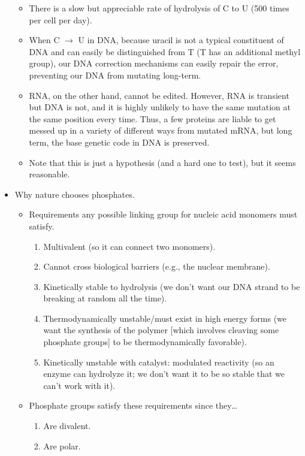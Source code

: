 \documentclass[../notes.tex]{subfiles}
\begin{document}
\begin{itemize}
    \begin{itemize}
        \item There is a slow but appreciable rate of hydrolysis of C to U (500 times per cell per day).
        \item When C $\to$ U in DNA, because uracil is not a typical constituent of DNA and can easily be distinguished from T (T has an additional methyl group), our DNA correction mechanisms can easily repair the error, preventing our DNA from mutating long-term.
        \item RNA, on the other hand, cannot be edited. However, RNA is transient but DNA is not, and it is highly unlikely to have the same mutation at the same position every time. Thus, a few proteins are liable to get messed up in a variety of different ways from mutated mRNA, but long term, the base genetic code in DNA is preserved.
        \item Note that this is just a hypothesis (and a hard one to test), but it seems reasonable.
    \end{itemize}
    \item Why nature chooses phosphates.
    \begin{itemize}
        \item Requirements any possible linking group for nucleic acid monomers must satisfy.
        \begin{enumerate}
            \item Multivalent (so it can connect two monomers).
            \item Cannot cross biological barriers (e.g., the nuclear membrane).
            \item Kinetically stable to hydrolysis (we don't want our DNA strand to be breaking at random all the time).
            \item Thermodynamically unstable/must exist in high energy forms (we want the synthesis of the polymer [which involves cleaving some phosphate groups] to be thermodynamically favorable).
            \item Kinetically unstable with catalyst: modulated reactivity (so an enzyme can hydrolyze it; we don't want it to be so stable that we can't work with it).
        \end{enumerate}
        \item Phosphate groups satisfy these requirements since they\dots
        \begin{enumerate}
            \item Are divalent.
            \item Are polar.

\end{enumerate}
\end{itemize}
\end{itemize}
\end{document}
